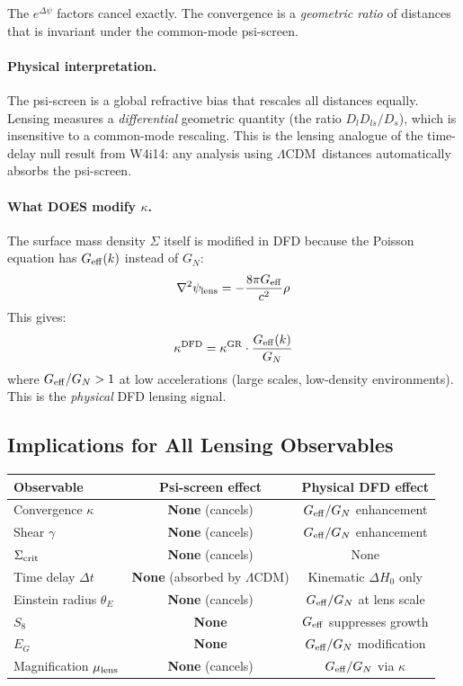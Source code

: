 \documentclass[11pt,a4paper]{article}
\newcommand{\LCDM}{$\Lambda$CDM}
\newcommand{\Geff}{G_{\rm eff}}
\newcommand{\Dpsi}{\Delta\psi}
\begin{document}
The $e^{\Dpsi}$ factors cancel exactly.  The convergence is a
\emph{geometric ratio} of distances that is invariant under the
common-mode psi-screen.

\paragraph{Physical interpretation.}
The psi-screen is a global refractive bias that rescales all distances
equally.  Lensing measures a \emph{differential} geometric quantity
(the ratio $D_l D_{ls}/D_s$), which is insensitive to a common-mode
rescaling.  This is the lensing analogue of the time-delay null result
from W4i14: any analysis using \LCDM\ distances automatically absorbs
the psi-screen.

\paragraph{What DOES modify $\kappa$.}
The surface mass density $\Sigma$ itself is modified in DFD because
the Poisson equation has $\Geff(k)$ instead of $G_N$:
\begin{equation}
\nabla^2\psi_{\rm lens} = -\frac{8\pi \Geff}{c^2}\rho
\end{equation}
This gives:
\begin{equation}
\kappa^{\rm DFD} = \kappa^{\rm GR} \cdot \frac{\Geff(k)}{G_N}
\end{equation}
where $\Geff/G_N > 1$ at low accelerations (large scales, low-density
environments).  This is the \emph{physical} DFD lensing signal.

\subsection{Implications for All Lensing Observables}

\begin{center}
\begin{tabular}{lcc}
\toprule
Observable & Psi-screen effect & Physical DFD effect \\
\midrule
Convergence $\kappa$ & \textbf{None} (cancels) & $\Geff/G_N$ enhancement \\
Shear $\gamma$ & \textbf{None} (cancels) & $\Geff/G_N$ enhancement \\
$\Sigma_{\rm crit}$ & \textbf{None} (cancels) & None \\
Time delay $\Delta t$ & \textbf{None} (absorbed by \LCDM) & Kinematic $\Delta H_0$ only \\
Einstein radius $\theta_E$ & \textbf{None} (cancels) & $\Geff/G_N$ at lens scale \\
$S_8$ & \textbf{None} & $\Geff$ suppresses growth \\
$E_G$ & \textbf{None} & $\Geff/G_N$ modification \\
Magnification $\mu_{\rm lens}$ & \textbf{None} (cancels) & $\Geff/G_N$ via $\kappa$ \\
\bottomrule
\end{tabular}
\end{center}
\end{document}
